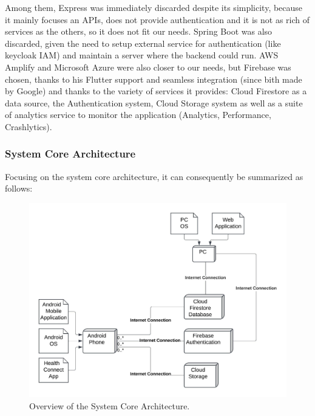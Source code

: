 \newpage
\noindent Among them, Express was immediately discarded despite its simplicity, because it mainly focuses an APIs, does not provide authentication and it is not as rich of services as the others, so it does not fit our needs. Spring Boot was also discarded, given the need to setup external service for authentication (like keycloak IAM) and maintain a server where the backend could run. AWS Amplify and Microsoft Azure were also closer to our needs, but Firebase was chosen, thanks to his Flutter support and seamless integration (since bith made by Google) and thanks to the variety of services it provides: Cloud Firestore as a data source, the Authentication system, Cloud Storage system as well as a suite of analytics service to monitor the application (Analytics, Performance, Crashlytics).
\subsubsection{System Core Architecture}

Focusing on the system core architecture, it can consequently be summarized as follows:
\begin{figure}
    \includegraphics[width=1.0\linewidth]{./images/system_architecture.jpeg}
    \caption{Overview of the System Core Architecture.}
    \label{fig:systemArchitecture}
\end{figure}

